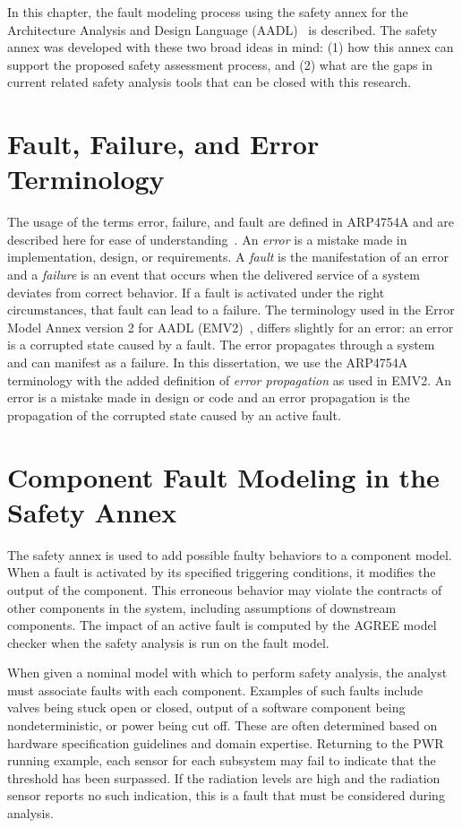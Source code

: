 In this chapter, the fault modeling process using the safety annex for the Architecture Analysis and Design Language (AADL)~\cite{AADL_Standard} is described. The safety annex was developed with these two broad ideas in mind: (1) how this annex can support the proposed safety assessment process, and (2) what are the gaps in current related safety analysis tools that can be closed with this research.

\section{Fault, Failure, and Error Terminology}
The usage of the terms error, failure, and fault are defined in ARP4754A and are described here for ease of understanding~\cite{SAE:ARP4754A}. An \textit{error} is a mistake made in implementation, design, or requirements. A \textit{fault} is the manifestation of an error and a \textit{failure} is an event that occurs when the delivered service of a system deviates from correct behavior. If a fault is activated under the right circumstances, that fault can lead to a failure. The terminology used in the Error Model Annex version 2 for AADL (EMV2)~\cite{EMV2}, differs slightly for an error: an error is a corrupted state caused by a fault. The error propagates through a system and can manifest as a failure. In this dissertation, we use the ARP4754A terminology with the added definition of \textit{error propagation} as used in EMV2. An error is a mistake made in design or code and an error propagation is the propagation of the corrupted state caused by an active fault. 




\section{Component Fault Modeling in the Safety Annex}
The safety annex is used to add possible faulty behaviors to a component model. When a fault is activated by its specified triggering conditions, it modifies the output of the component. This erroneous behavior may violate the contracts of other components in the system, including assumptions of downstream components. The impact of an active fault is computed by the AGREE model checker when the safety analysis is run on the fault model. 

When given a nominal model with which to perform safety analysis, the analyst must associate faults with each component. Examples of such faults include valves being stuck open or closed, output of a software component being nondeterministic, or power being cut off. These are often determined based on hardware specification guidelines and domain expertise. Returning to the PWR running example, each sensor for each subsystem may fail to indicate that the threshold has been surpassed. If the radiation levels are high and the radiation sensor reports no such indication, this is a fault that must be considered during analysis. 


